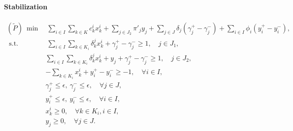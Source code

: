 \documentclass[12pt]{article}
\begin{document}
	
	\paragraph{Stabilization}
\begin{align*}
	(\tilde{P})~ \min& ~ \sum _ { i \in I } \sum _ { k \in K } c _ { k } ^ { i } x _ { k } ^ { i } + \sum_{ j \in J_2 } \pi'_j y_j + \sum_{ j \in J }\delta_j (\gamma_j^+ - \gamma_j^-) + \sum_{i \in I}\phi_i(y_i^+ - y_i^-),\\
\text { s.t. }&  ~ \sum _ { i \in I } \sum _ { k \in K _ { i } } \delta _ { k } ^ { j } x _ { k } ^ { i } + \gamma_j^+ - \gamma_j^- \geq 1 , \quad j \in J_1, \\
& \sum _ { i \in I } \sum _ { k \in K _ { i } } \delta _ { k } ^ { j } x _ { k } ^ { i } + y_j + \gamma_j^+ - \gamma_j^-\geq 1 , \quad j \in J_2, \\
&- \sum _ { k \in K _ { i } } x _ { k } ^ { i } +y_i^+ - y_i^-\geq - 1 , \quad \forall i \in I ,\\
	& \gamma_j^+ \leq \epsilon , ~ \gamma_j^- \leq \epsilon,\quad \forall j \in J,  \\
& y_i^+ \leq \epsilon, ~ y_i^-  \leq \epsilon, \quad \forall i \in I, \\
&x _ { k } ^ { i } \geq 0 , \quad \forall k \in K _ { i } , i \in I,\\
&y_j \geq 0, \quad \forall j \in J.
\end{align*}	
	
\end{document}
